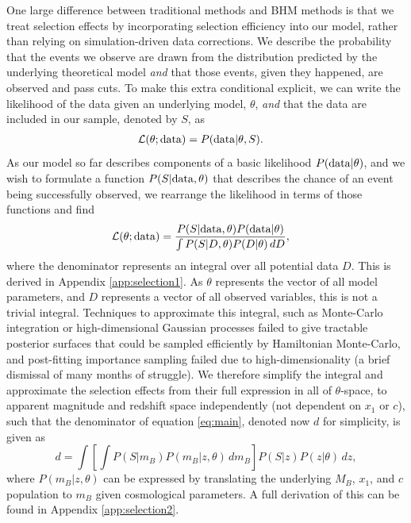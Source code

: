 \documentclass[twocolumn,trackchanges,tighten]{aastex62}
\begin{document}
One large difference between traditional methods and BHM methods is that we treat selection effects by incorporating selection efficiency into our model, rather than relying on simulation-driven data corrections. We describe the probability that the  events we observe are drawn from the distribution predicted by the underlying theoretical model \textit{and} that those events, given they happened, are observed and pass cuts.  To make this extra conditional explicit, we can write the likelihood of the data given an underlying model, $\theta$, \textit{and} that the data are included in our sample, denoted by $S$, as
\begin{align}
\mathcal{L}(\theta; {\rm data}) &= P({\rm data} | \theta, S). \label{eq:like}
\end{align}
As our model so far describes components of a basic likelihood $P({\rm data}|\theta)$, and we wish to formulate a function $P(S|{\rm data},\theta)$ that describes the chance of an event being successfully observed, we rearrange the likelihood in terms of those functions and find
\begin{align}
\mathcal{L}(\theta; {\rm data}) &= \frac{P(S|{\rm data},\theta) P({\rm data}|\theta)}{\int P(S | D, \theta) P(D|\theta)\, dD}, \label{eq:main}
\end{align}
where the denominator represents an integral over all potential data $D$. This is derived in Appendix \ref{app:selection1}.  As $\theta$ represents the vector of all model parameters, and $D$ represents a vector of all observed variables, this is not a trivial integral. Techniques to approximate this integral, such as Monte-Carlo integration or high-dimensional Gaussian processes failed to give tractable posterior surfaces that could be sampled efficiently by Hamiltonian Monte-Carlo, and post-fitting importance sampling failed due to high-dimensionality (a brief dismissal of many months of struggle). We therefore simplify the integral and approximate the selection effects from their full expression in all of $\theta$-space, to apparent magnitude and redshift space independently (not dependent on $x_1$ or $c$), such that the denominator of equation \eqref{eq:main}, denoted now $d$ for simplicity, is given as
\begin{equation}
d = \int  \left[ \int P(S|m_B) P(m_B | z, \theta)\, d m_B \right] P(S|z) P(z|\theta)\, dz, \label{eq:w1}
\end{equation}
where $P(m_B | z, \theta)$ can be expressed by translating the underlying $M_B$, $x_1$, and $c$ population to $m_B$ given cosmological parameters. A full derivation of this can be found in Appendix \ref{app:selection2}.
\end{document}
